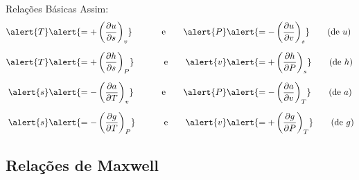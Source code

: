     \begin{frame}{Relações Básicas}\vspace*{-0em}
        Assim:
        \begin{alignat*}{2}
            \alert{T}         &\alert{=  +\left(\frac{\partial u}{\partial s}\right)_v}\qquad &
            \mbox{e}\qquad
            \alert{P}         &\alert{=  -\left(\frac{\partial u}{\partial v}\right)_s}\qquad
            \mbox{(de $u$)}   \\[\medskipamount]
            \alert{T}         &\alert{=  +\left(\frac{\partial h}{\partial s}\right)_P}\qquad &
            \mbox{e}\qquad
            \alert{v}         &\alert{=  +\left(\frac{\partial h}{\partial P}\right)_s}\qquad
            \mbox{(de $h$)}   \\[\medskipamount]
            \alert{s}         &\alert{=  -\left(\frac{\partial a}{\partial T}\right)_v}\qquad &
            \mbox{e}\qquad
            \alert{P}         &\alert{=  -\left(\frac{\partial a}{\partial v}\right)_T}\qquad
            \mbox{(de $a$)}   \\[\medskipamount]
            \alert{s}         &\alert{=  -\left(\frac{\partial g}{\partial T}\right)_P}\qquad &
            \mbox{e}\qquad
            \alert{v}         &\alert{=  +\left(\frac{\partial g}{\partial P}\right)_T}\qquad
            \mbox{(de $g$)}
        \end{alignat*}
    \end{frame}

    \subsection{Relações de Maxwell}

